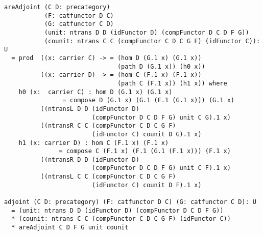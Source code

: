 \documentclass{article}
\begin{document}
\newpage
\begin{lstlisting}
areAdjoint (C D: precategory)
           (F: catfunctor D C)
           (G: catfunctor C D)
           (unit: ntrans D D (idFunctor D) (compFunctor D C D F G))
           (counit: ntrans C C (compFunctor C D C G F) (idFunctor C)): U
  = prod  ((x: carrier C) -> = (hom D (G.1 x) (G.1 x))
                               (path D (G.1 x)) (h0 x))
          ((x: carrier D) -> = (hom C (F.1 x) (F.1 x))
                               (path C (F.1 x)) (h1 x)) where
    h0 (x:  carrier C) : hom D (G.1 x) (G.1 x)
                = compose D (G.1 x) (G.1 (F.1 (G.1 x))) (G.1 x)
          ((ntransL D D (idFunctor D)
                        (compFunctor D C D F G) unit C G).1 x)
          ((ntransR C C (compFunctor C D C G F)
                        (idFunctor C) counit D G).1 x)
    h1 (x: carrier D) : hom C (F.1 x) (F.1 x)
               = compose C (F.1 x) (F.1 (G.1 (F.1 x))) (F.1 x)
          ((ntransR D D (idFunctor D)
                        (compFunctor D C D F G) unit C F).1 x)
          ((ntransL C C (compFunctor C D C G F)
                        (idFunctor C) counit D F).1 x)

adjoint (C D: precategory) (F: catfunctor D C) (G: catfunctor C D): U
  = (unit: ntrans D D (idFunctor D) (compFunctor D C D F G))
  * (counit: ntrans C C (compFunctor C D C G F) (idFunctor C))
  * areAdjoint C D F G unit counit
\end{lstlisting}

\end{document}
